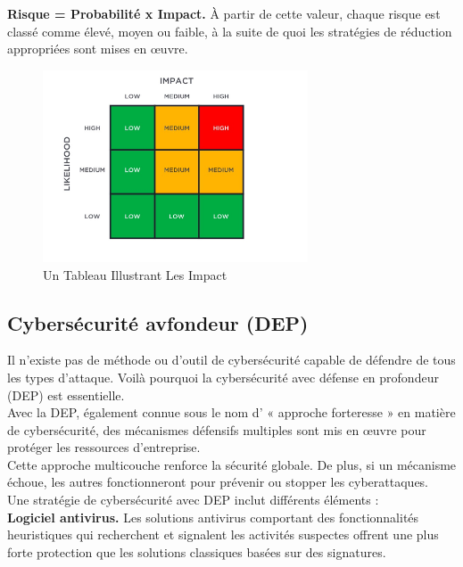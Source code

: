 \textbf{Risque = Probabilité x Impact.} À partir de cette valeur, chaque risque est classé comme élevé, moyen ou faible, à la suite de quoi les stratégies de réduction appropriées sont mises en œuvre.\\
	
	 
	 
\begin{figure}[h]
	\begin{center}
	\includegraphics[width=0.7\textwidth]{PhotoMemoire/tableauImpact.png}
\caption{Un Tableau Illustrant Les Impact \cite{15}}
\end{center}
\end{figure}

\subsection{Cybersécurité avfondeur (DEP)}
Il n’existe pas de méthode ou d’outil de cybersécurité capable de défendre de tous les types d’attaque. Voilà pourquoi la cybersécurité avec défense en profondeur (DEP) est essentielle.\\
Avec la DEP, également connue sous le nom d’ « approche forteresse » en matière de cybersécurité, des mécanismes défensifs multiples sont mis en œuvre pour protéger les ressources d’entreprise.\\
Cette approche multicouche renforce la sécurité globale. De plus, si un mécanisme échoue, les autres fonctionneront pour prévenir ou stopper les cyberattaques.\\

Une stratégie de cybersécurité avec DEP inclut différents éléments :\\

\textbf{Logiciel antivirus.} 
Les solutions antivirus comportant des fonctionnalités heuristiques qui recherchent et signalent les activités suspectes offrent une plus forte protection que les solutions classiques basées sur des signatures.\\

